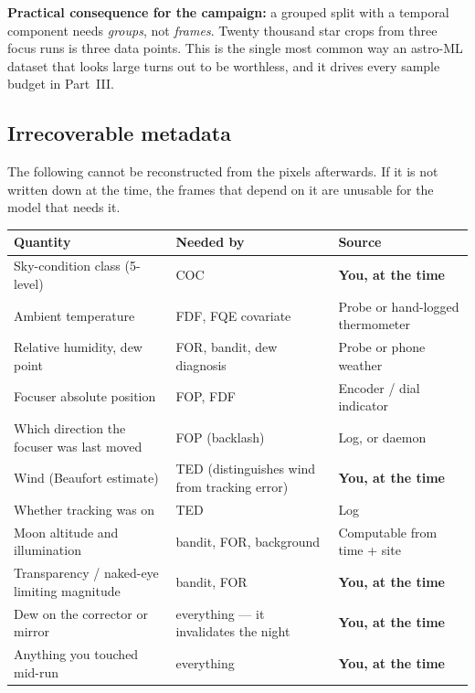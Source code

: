 \documentclass[11pt]{article}
\begin{document}
\begin{redbox}
\textbf{Practical consequence for the campaign:} a grouped split with a
temporal component needs \emph{groups}, not \emph{frames}. Twenty thousand star
crops from three focus runs is three data points. This is the single most common
way an astro-ML dataset that looks large turns out to be worthless, and it
drives every sample budget in Part~III.
\end{redbox}

\subsection{Irrecoverable metadata}

The following cannot be reconstructed from the pixels afterwards. If it is not
written down at the time, the frames that depend on it are unusable for the
model that needs it.

\begin{center}
\small
\begin{tabular}{@{}p{}p{}p{}@{}}
\toprule
\textbf{Quantity} & \textbf{Needed by} & \textbf{Source} \\
\midrule
Sky-condition class (5-level) & COC & \textbf{You, at the time} \\
Ambient temperature & FDF, FQE covariate & Probe or hand-logged thermometer \\
Relative humidity, dew point & FOR, bandit, dew diagnosis & Probe or phone weather \\
Focuser absolute position & FOP, FDF & Encoder / dial indicator \\
Which direction the focuser was last moved & FOP (backlash) & Log, or daemon \\
Wind (Beaufort estimate) & TED (distinguishes wind from tracking error) & \textbf{You, at the time} \\
Whether tracking was on & TED & Log \\
Moon altitude and illumination & bandit, FOR, background & Computable from time + site \\
Transparency / naked-eye limiting magnitude & bandit, FOR & \textbf{You, at the time} \\
Dew on the corrector or mirror & everything --- it invalidates the night & \textbf{You, at the time} \\
Anything you touched mid-run & everything & \textbf{You, at the time} \\
\bottomrule
\end{tabular}
\end{center}
\end{document}
